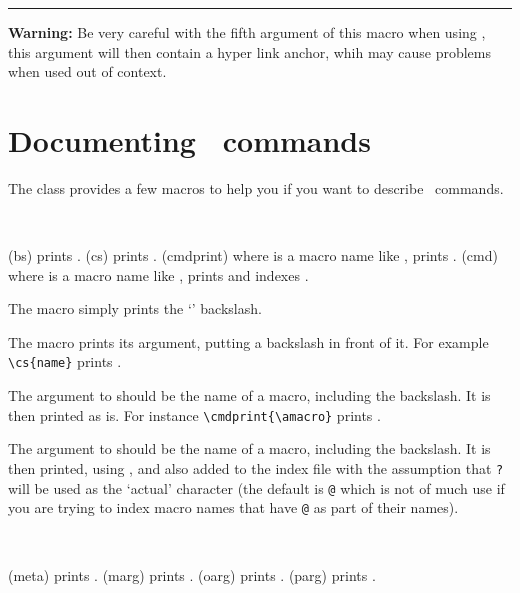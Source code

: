 \fancybreak{}

\textbf{Warning:} Be very careful with the fifth argument of this
macro when using , this argument will then contain a
hyper link anchor, whih may cause problems when used out of context.

\renewcommand\memsecinfo[5]{}
  
\section{Documenting \ltx\ commands}

    The class provides a few macros to help you if you want to describe
\ltx\ commands.

\begin{syntax}
\cmd{\bs} \cmd{\cs} \cmd{\cmdprint} \cmd{\cmd} \\
\end{syntax}
\glossary(bs)%
  {}%
  {prints \bs.}
\glossary(cs)%
  {}%
  {prints .}
\glossary(cmdprint)%
  {}%
  {where  is a macro name like , prints .}
\glossary(cmd)%
  {}%
  {where  is a macro name like , prints and indexes .}

The macro  simply prints the `\bs' backslash.

The macro  prints its argument, putting a backslash in front of it. For
example \verb?\cs{name}? prints .

The argument to  should be the name of a macro, including the 
backslash. It is then printed as is. For instance \verb?\cmdprint{\amacro}?
prints \cmdprint{\amacro}.

The argument to  should be the name of a macro, including the 
backslash. It is then printed, using , and also added to the 
index file with the assumption that \verb!?! will be used as the `actual' 
character (the default is \verb!@! which is not of much use if you are trying
to index macro names that have \verb!@! as part of their names).

\begin{syntax}
\cmd{\meta} \cmd{\marg} \cmd{\oarg} \cmd{\parg} \\
\end{syntax}
\glossary(meta)%
  {}%
  {prints .}
\glossary(marg)%
  {}%
  {prints .}
\glossary(oarg)%
  {}%
  {prints .}
\glossary(parg)%
  {}%
  {prints .}

